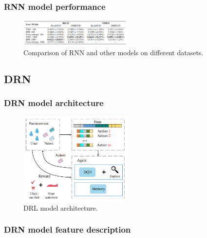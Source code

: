 \documentclass{ieeetj}
\begin{document}
\subsubsection{RNN model performance}
\begin{figure}[h]
	\centering
	\includegraphics[width=0.5\textwidth]{figures/rnn-performance.png}
	\caption{Comparison of RNN and other models on different datasets.}
	\label{fig:rnn-performance}
\end{figure}
\FloatBarrier
\subsection{DRN}
\subsubsection{DRN model architecture}
\begin{figure}[h]
\centering
\includegraphics[width=0.5\textwidth]{figures/drn-architecture.png}
\caption{DRL model architecture.}
\label{fig:drl}
\end{figure}

\FloatBarrier
\subsubsection{DRN model feature description}
\end{document}
